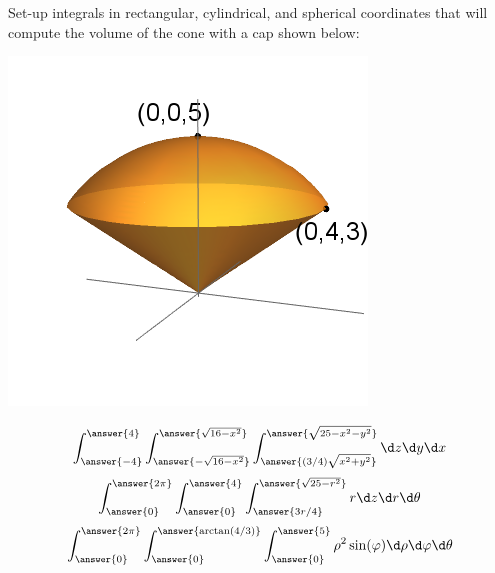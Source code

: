 \documentclass{ximera}
\author{Bart Snapp}
\begin{document}
\begin{exercise}
  Set-up integrals in rectangular, cylindrical, and spherical
  coordinates that will compute the volume of the cone with a cap shown below:
  \begin{image}
    \includegraphics{coneWithCap2.png}
  \end{image}
  \begin{prompt}
  \[
  \int_{\answer{-4}}^{\answer{4}}\int_{\answer{-\sqrt{16-x^2}}}^{\answer{\sqrt{16-x^2}}}\int_{\answer{(3/4)\sqrt{x^2+y^2}}}^{\answer{\sqrt{25-x^2-y^2}}}\d z \d y \d x
  \]
  \[
  \int_{\answer{0}}^{\answer{2\pi}}\int_{\answer{0}}^{\answer{4}}\int_{\answer{3r/4}}^{\answer{\sqrt{25-r^2}}}   r\d z \d r \d \theta
  \]
  \[
  \int_{\answer{0}}^{\answer{2\pi}}\int_{\answer{0}}^{\answer{\arctan(4/3)}}\int_{\answer{0}}^{\answer{5}}   \rho^2\sin(\varphi)\d \rho \d \varphi \d \theta
  \]
  \end{prompt}
\end{exercise}
\end{document}
